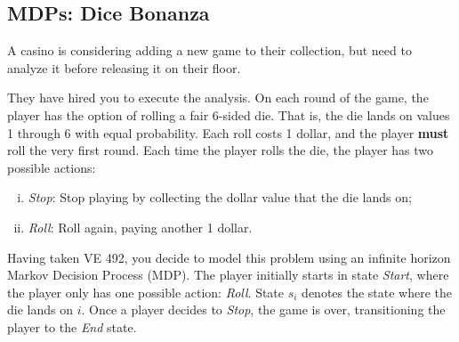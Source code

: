 \documentclass[11pt, answers]{exam}
\begin{document}
%
%
\begin{questions}
\section{MDPs: Dice Bonanza}
\question
A casino is considering adding a new game to their collection, but need to analyze it before releasing it on their floor. 

They have hired you to execute the analysis. On each round of the game, the player has the option of rolling a fair 6-sided die. That is, the die lands on values 1 through 6 with equal probability. Each roll costs 1 dollar, and the player \textbf{must} roll the very first round. Each time the player rolls the die, the player has two possible actions:
\begin{enumerate}[i.]
\item \textit{Stop}: Stop playing by collecting the dollar value that the die lands on;
\item \textit{Roll}: Roll again, paying another 1 dollar.
\end{enumerate}

Having taken VE 492, you decide to model this problem using an infinite horizon Markov Decision Process (MDP). The player initially starts in state \textit{Start}, where the player only has one possible action: \textit{Roll}. State $s_i$ denotes the state where the die lands on $i$. Once a player decides to \textit{Stop}, the game is over, transitioning the player to the \textit{End} state.

\end{questions}
\end{document}
